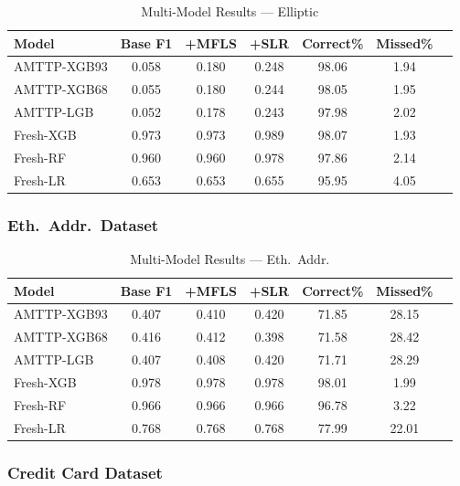 \documentclass[journal]{IEEEtran}
\begin{document}
\begin{table}[!t]
\centering
\caption{Multi-Model Results --- Elliptic}
\label{tab:multi_elliptic}
\setlength{\tabcolsep}{3pt}
\begin{tabular}{@{}lcccccc@{}}
\toprule
\textbf{Model} & \textbf{Base F1} & \textbf{+MFLS} & \textbf{+SLR} & \textbf{Correct\%} & \textbf{Missed\%} \\
\midrule
AMTTP-XGB93  & 0.058 & 0.180 & 0.248 & 98.06 & 1.94 \\
AMTTP-XGB68  & 0.055 & 0.180 & 0.244 & 98.05 & 1.95 \\
AMTTP-LGB    & 0.052 & 0.178 & 0.243 & 97.98 & 2.02 \\
Fresh-XGB    & 0.973 & 0.973 & 0.989 & 98.07 & 1.93 \\
Fresh-RF     & 0.960 & 0.960 & 0.978 & 97.86 & 2.14 \\
Fresh-LR     & 0.653 & 0.653 & 0.655 & 95.95 & 4.05 \\
\bottomrule
\end{tabular}
\end{table}

\subsubsection{Eth.\ Addr.\ Dataset}

\begin{table}[!t]
\centering
\caption{Multi-Model Results --- Eth.\ Addr.}
\label{tab:multi_eth_addr}
\setlength{\tabcolsep}{3pt}
\begin{tabular}{@{}lcccccc@{}}
\toprule
\textbf{Model} & \textbf{Base F1} & \textbf{+MFLS} & \textbf{+SLR} & \textbf{Correct\%} & \textbf{Missed\%} \\
\midrule
AMTTP-XGB93  & 0.407 & 0.410 & 0.420 & 71.85 & 28.15 \\
AMTTP-XGB68  & 0.416 & 0.412 & 0.398 & 71.58 & 28.42 \\
AMTTP-LGB    & 0.407 & 0.408 & 0.420 & 71.71 & 28.29 \\
Fresh-XGB    & 0.978 & 0.978 & 0.978 & 98.01 & 1.99 \\
Fresh-RF     & 0.966 & 0.966 & 0.966 & 96.78 & 3.22 \\
Fresh-LR     & 0.768 & 0.768 & 0.768 & 77.99 & 22.01 \\
\bottomrule
\end{tabular}
\end{table}

\subsubsection{Credit Card Dataset}
\end{document}
